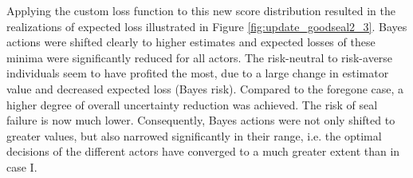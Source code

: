 				Applying the custom loss function to this new score distribution resulted in the realizations of expected loss illustrated in Figure \ref{fig:update_goodseal2_3}. Bayes actions were shifted clearly to higher estimates and expected losses of these minima were significantly reduced for all actors. The risk-neutral to risk-averse individuals seem to have profited the most, due to a large change in estimator value and decreased expected loss (Bayes risk). Compared to the foregone case, a higher degree of overall uncertainty reduction was achieved. The risk of seal failure is now much lower. Consequently, Bayes actions were not only shifted to greater values, but also narrowed significantly in their range, i.e. the optimal decisions of the different actors have converged to a much greater extent than in case I.\\		
				
